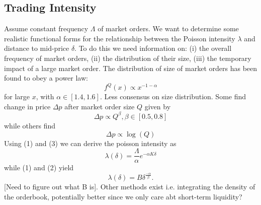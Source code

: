 \documentclass{article}
\begin{document}
\subsection{Trading Intensity}
Assume constant frequency $\Lambda$ of market orders. We want to determine some realistic functional forms for the relationship between the Poisson intensity $\lambda$ and distance to mid-price $\delta$. To do this we need information on: (i) the overall frequency of market orders, (ii) the distribution of their size, (iii) the temporary impact of a large market order. The distribution of size of market orders has been found to obey a power law:
\begin{equation}
    f^{Q}(x)\propto x^{-1-\alpha}
\end{equation}
for large $x$, with $\alpha\in[1.4,1.6].$
Less consensus on size distribution. Some find change in price $\Delta p$ after market order size $Q$ given by 
\begin{equation}
    \Delta p\propto Q^\beta, \beta\in[0.5,0.8]
\end{equation}
while others find
\begin{equation}
    \Delta p\propto\log(Q)
\end{equation}
Using (1) and (3) we can derive the poisson intensity as
$$\lambda(\delta)=\frac{\Lambda}{\alpha}e^{-\alpha K\delta}$$
while (1) and (2) yield
$$\lambda(\delta)=B\delta^{\frac{-\alpha}{\beta}}.$$
[Need to figure out what B is]. Other methods exist i.e. integrating the density of the orderbook, potentially better since we only care abt short-term liquidity?
\end{document}
